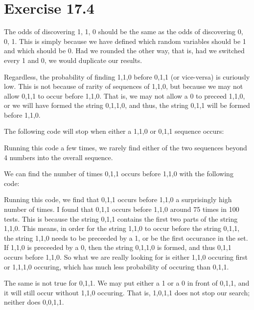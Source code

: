 \documentclass[11pt]{article}
\begin{document}
\section*{Exercise 17.4}

The odds of discovering 1, 1, 0 should be the same as the odds of discovering
0, 0, 1. This is simply because we have defined which random variables should be
1 and which should be 0. Had we rounded the other way, that is, had we switched
every 1 and 0, we would duplicate our results.

Regardless, the probability of finding 1,1,0 before 0,1,1 (or vice-versa) is 
curiously low. This is not because of rarity of sequences of 1,1,0, but because
we may not allow 0,1,1 to occur before 1,1,0. That is, we may not
allow a 0 to preceed 1,1,0, or we will have formed the string 
0,1,1,0, and thus, the string 0,1,1 will be formed before 1,1,0.

The following code will stop when either a 1,1,0 or 0,1,1 sequence occurs:


Running this code a few times, we rarely find either of the two sequences beyond
4 numbers into the overall sequence.

\pagebreak

We can find the number of times 0,1,1 occurs before 1,1,0 with the following code:


Running this code, we find that 0,1,1 occurs before 1,1,0 a surprisingly 
high number of times. I found that 0,1,1 occurs before 1,1,0 around 
75 times in 100 tests. This is because the string 0,1,1 contains the
first two parts of the string 1,1,0. This means, in order for the 
string 1,1,0 to occur before the string 0,1,1, the string 1,1,0 needs
to be preceeded by a 1, or be the first occurance in the set. If 
1,1,0 is preceeded by a 0, then the string 0,1,1,0 is formed, and
thus 0,1,1 occurs before 1,1,0. So what we are really looking for
is either 1,1,0 occuring first or 1,1,1,0 occuring, which has much
less probability of occuring than 0,1,1. 

The same is not true for 0,1,1. We may put either a 1 or a 0 in front
of 0,1,1, and it will still occur without 1,1,0 occuring. That is,
1,0,1,1  does not stop our search; neither does 0,0,1,1.
\end{document}
